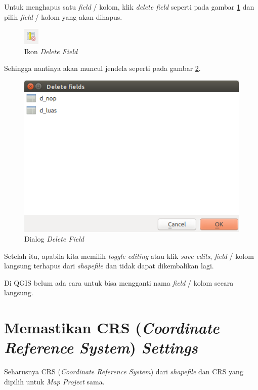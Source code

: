 Untuk menghapus satu \textit{field} / kolom, klik \textit{delete field} seperti pada gambar \ref{fig:icondeletefield} dan pilih \textit{field} / kolom yang akan dihapus.

\begin{figure}[H]
  \centering
  \includegraphics[scale=1]{./resources/045-delete-field-icon}
  \caption{Ikon \textit{Delete Field}}
  \label{fig:icondeletefield}
\end{figure}

Sehingga nantinya akan muncul jendela seperti pada gambar \ref{fig:deletefielddialog}.

\begin{figure}[H]
  \centering
  \includegraphics[scale=1]{./resources/046-delete-field-dialog}
  \caption{Dialog \textit{Delete Field}}
  \label{fig:deletefielddialog}
\end{figure}

Setelah itu, apabila kita memilih \textit{toggle editing} atau klik \textit{save edits}, \textit{field} / kolom langsung terhapus dari \textit{shapefile} dan tidak dapat dikembalikan lagi.

Di QGIS belum ada cara untuk bisa mengganti nama \textit{field} / kolom secara langsung.

\section{Memastikan CRS (\textit{Coordinate Reference System}) \textit{Settings}}

Seharusnya CRS (\textit{Coordinate Reference System}) dari \textit{shapefile} dan CRS yang dipilih untuk \textit{Map Project} sama.

